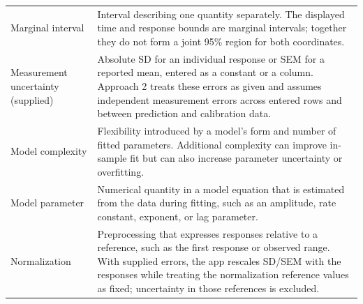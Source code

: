 \begin{longtable}{@{}>{\raggedright\arraybackslash}p{}>{\raggedright\arraybackslash}p{}@{}}


Marginal interval & Interval describing one quantity separately. The displayed time and response bounds are marginal intervals; together they do not form a joint 95\% region for both coordinates. \\

Measurement uncertainty (supplied) & Absolute SD for an individual response or SEM for a reported mean, entered as a constant or a column. Approach 2 treats these errors as given and assumes independent measurement errors across entered rows and between prediction and calibration data. \\

Model complexity & Flexibility introduced by a model's form and number of fitted parameters. Additional complexity can improve in-sample fit but can also increase parameter uncertainty or overfitting. \\

Model parameter & Numerical quantity in a model equation that is estimated from the data during fitting, such as an amplitude, rate constant, exponent, or lag parameter. \\


Normalization & Preprocessing that expresses responses relative to a reference, such as the first response or observed range. With supplied errors, the app rescales SD/SEM with the responses while treating the normalization reference values as fixed; uncertainty in those references is excluded. \\



\end{longtable}
